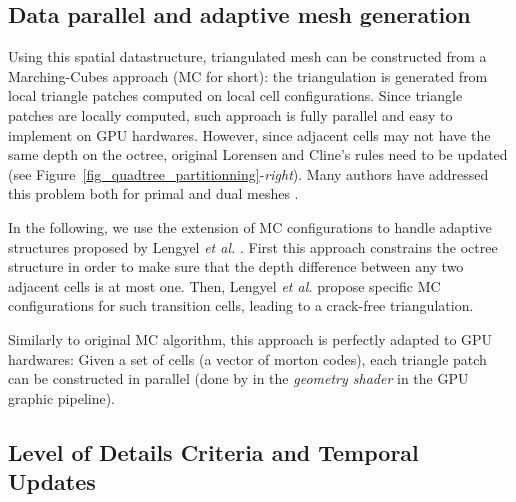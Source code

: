 \documentclass{llncs}
\begin{document}
\subsection{Data parallel and adaptive mesh generation}



Using this spatial datastructure, triangulated mesh can be constructed
from a Marching-Cubes approach \cite{lorensen1987marching} (MC for short): the
triangulation is generated from local triangle patches computed on
local cell configurations. Since triangle patches are locally
computed, such approach is fully parallel and easy to implement on GPU
hardwares. However, since adjacent cells may not have the same depth
on the octree, original Lorensen and Cline's rules need to be
updated (see Figure~\ref{fig_quadtree_partitionning}-\emph{right}). Many authors have addressed this problem both for primal and
dual meshes
\cite{shu1995adaptive,schaefer2004dual,lengyel2010voxel,DBLP:journals/cgf/LewinerMPPL10,DBLP:journals/cvgip/LobelloDD14}.

In the following, we use the extension of MC configurations to handle
adaptive structures proposed by Lengyel \emph{et al.}
\cite{lengyel2010voxel}. First this approach constrains the octree
structure in order to make sure that the depth difference between any
two adjacent cells is at most one. Then, Lengyel \emph{et al.} propose
specific MC configurations for such transition cells,  leading to a
crack-free triangulation.

Similarly to original MC algorithm, this approach is perfectly adapted
to GPU hardwares: Given a set of cells (a vector of morton codes),
each triangle patch can be constructed in parallel (done by
in the \emph{geometry shader} in the GPU graphic pipeline).

\subsection{Level of Details Criteria and Temporal Updates}
\end{document}
